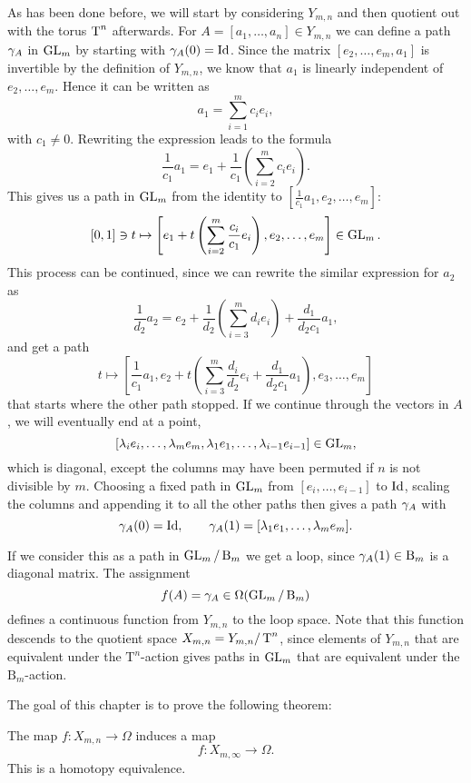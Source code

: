 As has been done before, we will start by considering $Y_{m,n}$ and
then quotient out with the torus $\operatorname{T}^n$ afterwards.
For $A = [a_1,\dots,a_n]\in Y_{m,n}$ we
can define a path $ \gamma_A$ in $\operatorname{GL}_m$ by starting with
$\gamma_A(0) = \operatorname{Id}$. Since the matrix $[e_2,\dots,e_m,a_1]$ is
invertible by the definition of $Y_{m,n}$, we know that $a_1$ is
linearly independent of $e_2,\dots,e_m$. Hence it can be written as
\[ a_1 = \sum_{i=1}^m c_i e_i, \]
with $c_1 \neq 0$. Rewriting the expression leads to the formula
\[  \frac{1}{c_1} a_1= e_1 + \frac{1}{c_1} \left(\sum_{i=2}^m c_i
  e_i\right). \]
This gives us a path in $\operatorname{GL}_m$ from the identity to
$\left[\frac{1}{c_1} a_1,e_2,\dots,e_m\right]$:
\[ [0,1]\ni t \mapsto \left[ e_1 + t\left(\sum_{i=2}^m
    \frac{c_i}{c_1}e_i\right),e_2,\dots,e_m \right] \in \operatorname{GL}_m. \]
This process can be continued, since we can rewrite the similar
expression for $a_2$ as
\[ \frac{1}{d_2}a_2 = e_2 + \frac{1}{d_2}\left(\sum_{i=3}^m d_i
  e_i\right) + \frac{d_1}{d_2c_1}a_1, \]
and get a path
\[ t\mapsto \left[\frac{1}{c_1}a_1,e_2+t\left(\sum_{i=3}^m
    \frac{d_i}{d_2}e_i +
    \frac{d_1}{d_2c_1}a_1\right),e_3,\dots,e_m\right] \]
that starts where the other path stopped. If we continue through the
vectors in $A$, we will eventually end at a point,
\[ [\lambda_i e_i,\dots,\lambda_me_m,\lambda_1e_1,\dots,\lambda_{i-1}e_{i-1}]\in \operatorname{GL}_m, \]
which is diagonal, except the columns may have been
permuted if $n$ is not divisible by $m$. Choosing a fixed path in
$\operatorname{GL}_m$ from $[e_i,\dots,e_{i-1}]$ to $\operatorname{Id}$, scaling the columns and
appending it to all the other paths then gives a path $ \gamma_A$ with
\[  \gamma_A(0) = \operatorname{Id}, \qquad \gamma_A(1) =
[\lambda_1e_1,\dots,\lambda_me_m]. \]

If we consider this as a path in $\operatorname{GL}_{m}/\operatorname{B}_{m}$ we
get a loop, since $\gamma_A(1)\in\operatorname{B}_m$ is a diagonal matrix. The
assignment
\[ f(A) = \gamma_A \in \Omega(\operatorname{GL}_{m}/\operatorname{B}_{m}) \]
defines a continuous function from $Y_{m,n}$ to the loop space. Note
that 
this function descends to the quotient space $X_{m,n}=Y_{m,n}/\operatorname{T}^n$, since
elements of $Y_{m,n}$ that are equivalent under the $\mathrm{T}^n$-action gives
paths in $\operatorname{GL}_m$ that are equivalent under the $\mathrm{B}_m$-action.

The goal of this chapter is to prove the following theorem:

\begin{theorem}
  The map $f : X_{m,n} \to \Omega$ induces a map
  \[ f : X_{m,\infty} \to \Omega. \]
  This is a homotopy equivalence.
\end{theorem}

